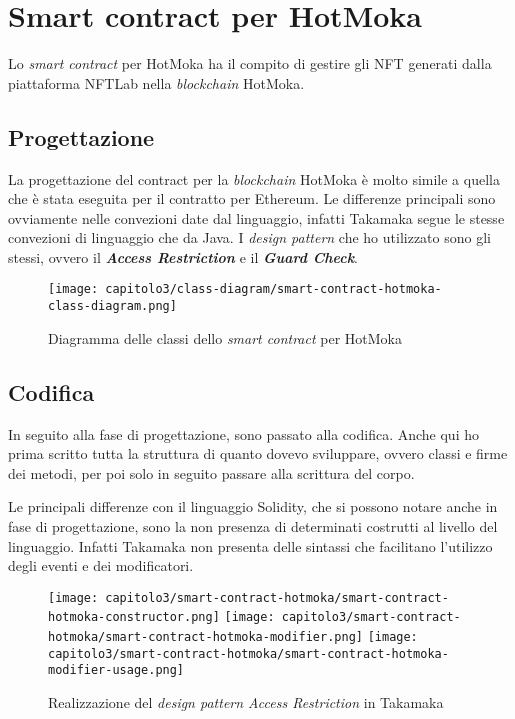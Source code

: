 
\section{Smart contract per HotMoka}
Lo \textit{smart contract} per HotMoka ha il compito di gestire gli NFT generati dalla piattaforma NFTLab nella \textit{blockchain} HotMoka.

\subsection{Progettazione}
La progettazione del contract per la \textit{blockchain} HotMoka è molto simile a quella che è stata eseguita per il contratto per Ethereum. Le differenze principali sono ovviamente nelle convezioni date dal linguaggio, infatti Takamaka segue le stesse convezioni di linguaggio che da Java. 
I \textit{design pattern} che ho utilizzato sono gli stessi, ovvero il \textbf{\textit{Access Restriction}} e il \textbf{\textit{Guard Check}}.

\begin{figure}[h!]
  \centering
  \texttt{[image: capitolo3/class-diagram/smart-contract-hotmoka-class-diagram.png]}
  \caption{Diagramma delle classi dello \textit{smart contract} per HotMoka}
\end{figure}

\subsection{Codifica}
In seguito alla fase di progettazione, sono passato alla codifica. Anche qui ho prima scritto tutta la struttura di quanto dovevo sviluppare, ovvero classi e firme dei metodi, per poi solo in seguito passare alla scrittura del corpo.

Le principali differenze con il linguaggio Solidity, che si possono notare anche in fase di progettazione, sono la non presenza di determinati costrutti al livello del linguaggio. Infatti Takamaka non presenta delle sintassi che facilitano l'utilizzo degli eventi e dei modificatori.

\begin{figure}[h!]
  \centering
  \texttt{[image: capitolo3/smart-contract-hotmoka/smart-contract-hotmoka-constructor.png]}
  \texttt{[image: capitolo3/smart-contract-hotmoka/smart-contract-hotmoka-modifier.png]}
  \texttt{[image: capitolo3/smart-contract-hotmoka/smart-contract-hotmoka-modifier-usage.png]}
  \caption{Realizzazione del \textit{design pattern Access Restriction} in Takamaka}
\end{figure}

